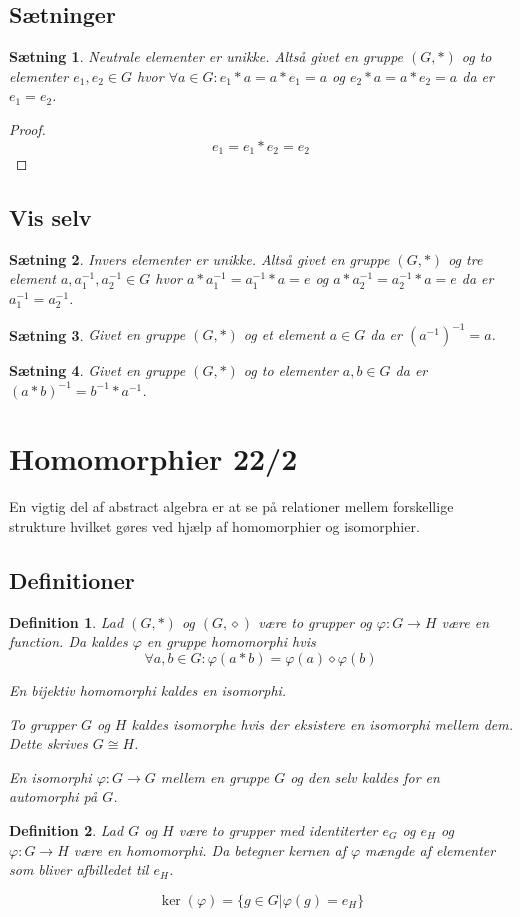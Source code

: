 \documentclass{article}
\newcommand{\inv}{^{-1}}
\newcommand{\too}{\rightarrow}
\newtheorem{setn}{Sætning}
\newtheorem{defi}{Definition}
\begin{document}
		\subsection*{Sætninger}
		\begin{setn}
			Neutrale elementer er unikke. Altså givet en gruppe $(G,*)$ og to elementer
			$e_1, e_2 \in G$ hvor $\forall a \in G: e_1*a=a*e_1=a$ og $e_2*a=a*e_2=a$
			da er $e_1 = e_2$.
		\end{setn}
		\begin{proof}
			$$e_1 = e_1*e_2 = e_2$$
		\end{proof}
		\subsection*{Vis selv}
		\begin{setn}
			Invers elementer er unikke. Altså givet en gruppe $(G,*)$ og tre element
			$a,a_1\inv,a_2\inv\in G$ hvor $a*a_1\inv=a_1\inv*a=e$ og $a*a_2\inv=a_2\inv*a=e$
			da er $a_1\inv = a_2\inv$.
		\end{setn}
		\begin{setn}
			Givet en gruppe $(G,*)$ og et element $a \in G$ da er $(a\inv)\inv = a$.
		\end{setn}
		\begin{setn}
			Givet en gruppe $(G,*)$ og to elementer $a,b \in G$ da er $(a*b)\inv=b\inv*a\inv$.
		\end{setn}
	\newpage
	\section*{Homomorphier 22/2}
		En vigtig del af abstract algebra er at se på relationer mellem
		forskellige strukture hvilket gøres ved hjælp af homomorphier og isomorphier.
		\subsection*{Definitioner}
		\begin{defi}
			Lad $(G,*)$ og $(G,\diamond)$ være to grupper og $\varphi: G \too H$ være
			en function. Da kaldes $\varphi$ en gruppe homomorphi hvis
			$$\forall a, b \in G: \varphi(a*b) = \varphi(a) \diamond \varphi(b)$$

			En bijektiv homomorphi kaldes en isomorphi.

			To grupper $G$ og $H$ kaldes isomorphe hvis der eksistere en isomorphi
			mellem dem. Dette skrives $G \cong H$.

			En isomorphi $\varphi: G \too G$ mellem en gruppe $G$ og den selv kaldes for en
			automorphi på $G$.
		\end{defi}
		\begin{defi}
			Lad $G$ og $H$ være to grupper med identiterter $e_G$ og $e_H$
			og $\varphi: G \too H$ være en homomorphi.
			Da betegner kernen af $\varphi$ mængde af elementer som bliver
			afbilledet til $e_H$.

			$$\ker(\varphi) = \{g \in G | \varphi(g) = e_H\}$$
		\end{defi}
\end{document}
